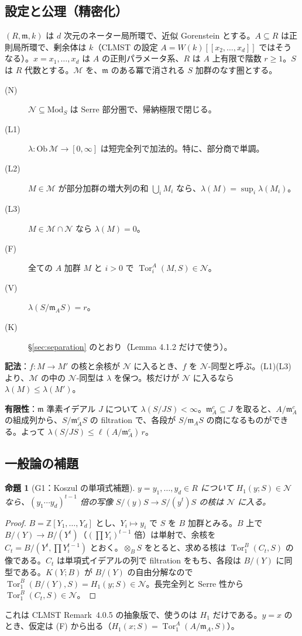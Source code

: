 \documentclass[11pt,a4paper]{ltjsarticle}
\theoremstyle{plain}
\theoremstyle{definition}
\theoremstyle{remark}
\theoremstyle{plain}
\newtheorem*{proposition*}{命題}
\newcommand{\m}{\mathfrak{m}}
\newcommand{\Tor}{\operatorname{Tor}}
\begin{document}
\subsection{設定と公理（精密化）}
$(R,\m,k)$ は $d$ 次元のネーター局所環で、近似 Gorenstein とする。$A\subseteq R$ は正則局所環で、剰余体は $k$（CLMST の設定 $A = W(k)[[x_2,\dots,x_d]]$ ではそうなる）。$x = x_1,\dots,x_d$ は $A$ の正則パラメータ系、$R$ は $A$ 上有限で階数 $r\ge1$。$S$ は $R$ 代数とする。$\mathcal{M}$ を、$\m$ のある冪で消される $S$ 加群のなす圏とする。
\begin{description}
  \item[(N)] $\mathcal{N}\subseteq\mathrm{Mod}_S$ は Serre 部分圏で、帰納極限で閉じる。
  \item[(L1)] $\lambda\colon\mathrm{Ob}\,\mathcal{M}\to[0,\infty]$ は短完全列で加法的。特に、部分商で単調。
  \item[(L2)] $M\in\mathcal{M}$ が部分加群の増大列の和 $\bigcup_i M_i$ なら、$\lambda(M) = \sup_i\lambda(M_i)$。
  \item[(L3)] $M\in\mathcal{M}\cap\mathcal{N}$ なら $\lambda(M) = 0$。
  \item[(F)] 全ての $A$ 加群 $M$ と $i>0$ で $\Tor^A_i(M,S)\in\mathcal{N}$。
  \item[(V)] $\lambda(S/\m_A S) = r$。
  \item[(K)] \S\ref{sec:separation} のとおり（Lemma 4.1.2 だけで使う）。
\end{description}
\textbf{記法}：$f\colon M\to M'$ の核と余核が $\mathcal{N}$ に入るとき、$f$ を $\mathcal{N}$-同型と呼ぶ。(L1)(L3) より、$\mathcal{M}$ の中の $\mathcal{N}$-同型は $\lambda$ を保つ。核だけが $\mathcal{N}$ に入るなら $\lambda(M)\le\lambda(M')$。

\textbf{有限性}：$\m$ 準素イデアル $J$ について $\lambda(S/JS)<\infty$。$\m_A^c\subseteq J$ を取ると、$A/\m_A^c$ の組成列から、$S/\m_A^cS$ の filtration で、各段が $S/\m_AS$ の商になるものができる。よって $\lambda(S/JS)\le\ell(A/\m_A^c)\,r$。

\subsection{一般論の補題}
\begin{proposition*}[G1：Koszul の単項式補題]
$y = y_1,\dots,y_d\in R$ について $H_1(y;S)\in\mathcal{N}$ なら、$(y_1\cdots y_d)^{t-1}$ 倍の写像 $S/(y)S\to S/(y^t)S$ の核は $\mathcal{N}$ に入る。
\end{proposition*}
\begin{proof}
$B = \mathbb{Z}[Y_1,\dots,Y_d]$ とし、$Y_i\mapsto y_i$ で $S$ を $B$ 加群とみる。$B$ 上で $B/(Y)\to B/(Y^t)$（$(\prod Y_i)^{t-1}$ 倍）は単射で、余核を $C_t = B/(Y^t,\prod Y_i^{t-1})$ とおく。$\otimes_BS$ をとると、求める核は $\Tor^B_1(C_t,S)$ の像である。$C_t$ は単項式イデアルの列で filtration をもち、各段は $B/(Y)$ に同型である。$K(Y;B)$ が $B/(Y)$ の自由分解なので $\Tor_1^B(B/(Y),S) = H_1(y;S)\in\mathcal{N}$。長完全列と Serre 性から $\Tor_1^B(C_t,S)\in\mathcal{N}$。
\end{proof}
これは CLMST Remark~4.0.5 の抽象版で、使うのは $H_1$ だけである。$y = x$ のとき、仮定は (F) から出る（$H_1(x;S) = \Tor_1^A(A/\m_A,S)$）。
\end{document}
